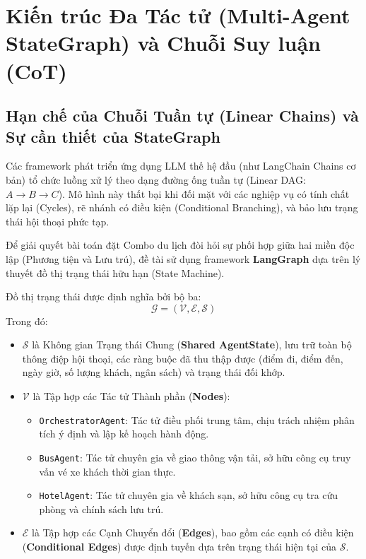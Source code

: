 \section{Kiến trúc Đa Tác tử (Multi-Agent StateGraph) và Chuỗi Suy luận (CoT)}

\subsection{Hạn chế của Chuỗi Tuần tự (Linear Chains) và Sự cần thiết của StateGraph}
Các framework phát triển ứng dụng LLM thế hệ đầu (như LangChain Chains cơ bản) tổ chức luồng xử lý theo dạng đường ống tuần tự (Linear DAG: $A \rightarrow B \rightarrow C$). Mô hình này thất bại khi đối mặt với các nghiệp vụ có tính chất lặp lại (Cycles), rẽ nhánh có điều kiện (Conditional Branching), và bảo lưu trạng thái hội thoại phức tạp.

Để giải quyết bài toán đặt Combo du lịch đòi hỏi sự phối hợp giữa hai miền độc lập (Phương tiện và Lưu trú), đề tài sử dụng framework \textbf{LangGraph} dựa trên lý thuyết đồ thị trạng thái hữu hạn (State Machine). 

Đồ thị trạng thái được định nghĩa bởi bộ ba:
\begin{equation}
    \mathcal{G} = (\mathcal{V}, \mathcal{E}, \mathcal{S})
\end{equation}
Trong đó:
\begin{itemize}
    \item $\mathcal{S}$ là Không gian Trạng thái Chung (\textbf{Shared AgentState}), lưu trữ toàn bộ thông điệp hội thoại, các ràng buộc đã thu thập được (điểm đi, điểm đến, ngày giờ, số lượng khách, ngân sách) và trạng thái đối khớp.
    \item $\mathcal{V}$ là Tập hợp các Tác tử Thành phần (\textbf{Nodes}):
    \begin{itemize}
        \item \texttt{OrchestratorAgent}: Tác tử điều phối trung tâm, chịu trách nhiệm phân tích ý định và lập kế hoạch hành động.
        \item \texttt{BusAgent}: Tác tử chuyên gia về giao thông vận tải, sở hữu công cụ truy vấn vé xe khách thời gian thực.
        \item \texttt{HotelAgent}: Tác tử chuyên gia về khách sạn, sở hữu công cụ tra cứu phòng và chính sách lưu trú.
    \end{itemize}
    \item $\mathcal{E}$ là Tập hợp các Cạnh Chuyển đổi (\textbf{Edges}), bao gồm các cạnh có điều kiện (\textbf{Conditional Edges}) được định tuyến dựa trên trạng thái hiện tại của $\mathcal{S}$.
\end{itemize}

